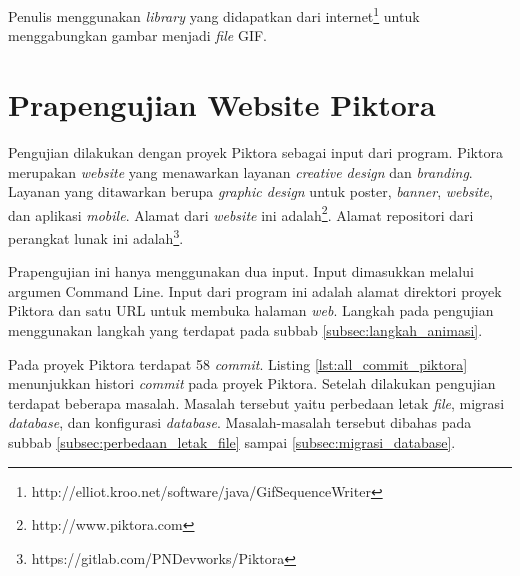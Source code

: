 Penulis menggunakan \textit{library} yang didapatkan dari internet\footnote{http://elliot.kroo.net/software/java/GifSequenceWriter} untuk menggabungkan gambar menjadi \textit{file} GIF. 

\section{Prapengujian Website Piktora}
\label{sec:prapengujian}
Pengujian dilakukan dengan proyek Piktora sebagai input dari program. Piktora merupakan \textit{website} yang menawarkan layanan  \textit{creative design} dan \textit{branding}. Layanan yang ditawarkan berupa \textit{graphic design} untuk poster, \textit{banner}, \textit{website}, dan aplikasi \textit{mobile}. Alamat dari \textit{website} ini adalah\footnote{http://www.piktora.com}. Alamat repositori dari perangkat lunak ini 
adalah\footnote{https://gitlab.com/PNDevworks/Piktora}.

Prapengujian ini hanya menggunakan dua input. Input dimasukkan melalui argumen Command Line. Input dari program ini adalah alamat direktori proyek Piktora dan satu URL untuk membuka halaman \textit{web}. Langkah pada pengujian menggunakan langkah yang terdapat pada subbab \ref{subsec:langkah_animasi}. 


Pada proyek Piktora terdapat 58 \textit{commit}. Listing \ref{lst:all_commit_piktora} menunjukkan histori \textit{commit} pada proyek Piktora. Setelah dilakukan pengujian terdapat beberapa masalah. Masalah tersebut yaitu perbedaan letak \textit{file}, migrasi \textit{database}, dan konfigurasi \textit{database}. Masalah-masalah tersebut dibahas pada subbab \ref{subsec:perbedaan_letak_file} sampai \ref{subsec:migrasi_database}.

